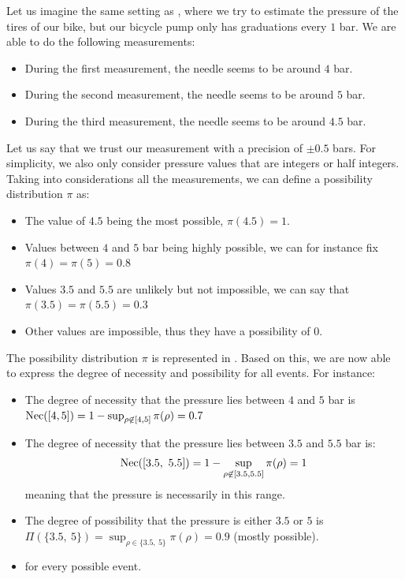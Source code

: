 \begin{example}\label{ex:bicycle_pressure_possibility}
    Let us imagine the same setting as , where we try to estimate the pressure of the tires of our bike, but our bicycle pump only has graduations every $1$ bar. We are able to do the following measurements:
    \begin{itemize}
        \item During the first measurement, the needle seems to be around $4$ bar.
        \item During the second measurement, the needle seems to be around $5$ bar.
        \item During the third measurement, the needle seems to be around $4.5$ bar.
    \end{itemize}
    Let us say that we trust our measurement with a precision of $\pm0.5$ bars. For simplicity, we also only consider pressure values that are integers or half integers. Taking into considerations all the measurements, we can define a possibility distribution $\pi$ as:
    \begin{itemize}
        \item The value of $4.5$ being the most possible, $\pi(4.5)=1$.
        \item Values between $4$ and $5$ bar being highly possible, we can for instance fix $\pi(4)=\pi(5)=0.8$
        \item Values $3.5$ and $5.5$ are unlikely but not impossible, we can say that $\pi(3.5)=\pi(5.5)=0.3$
        \item Other values are impossible, thus they have a possibility of $0$.
    \end{itemize}
    The possibility distribution $\pi$ is represented in . 
    Based on this, we are now able to express the degree of necessity and possibility for all events. For instance:
    \begin{itemize}
        \item The degree of necessity that the pressure lies between $4$ and $5$ bar is $\mathrm{Nec}([4, 5])=1-\sup_{\rho\not\in[4,5]}\pi(\rho)=0.7$
        \item The degree of necessity that the pressure lies between $3.5$ and $5.5$ bar is: 
        \begin{align*}
            \mathrm{Nec}([3.5,~ 5.5]) = 1-\sup_{\rho\not\in[3.5,5.5]}\pi(\rho) = 1
        \end{align*}
        meaning that the pressure is necessarily in this range.
        \item The degree of possibility that the pressure is either $3.5$ or  $5$ is $\Pi (\{3.5,~5\})=\sup_{\rho\in\{3.5,~5\}}\pi(\rho)=0.9$ (mostly possible).
        \item \etc for every possible event.
    \end{itemize}
\end{example}

